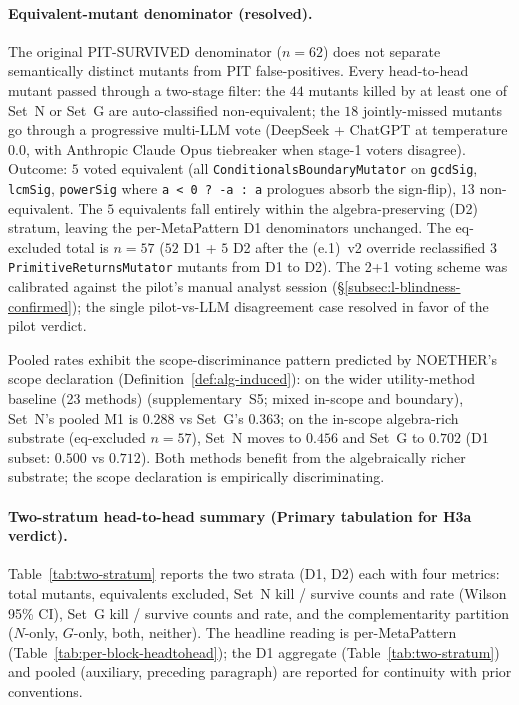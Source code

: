 \documentclass[acmsmall,screen,review]{acmart}
\begin{document}
\paragraph{Equivalent-mutant denominator (resolved).}\label{para:eq-mutant-footnote}
The original PIT-SURVIVED denominator ($n = 62$) does not separate semantically distinct mutants from PIT false-positives. Every head-to-head mutant passed through a two-stage filter: the $44$ mutants killed by at least one of Set~N or Set~G are auto-classified non-equivalent; the $18$ jointly-missed mutants go through a progressive multi-LLM vote (DeepSeek + ChatGPT at temperature $0.0$, with Anthropic Claude Opus tiebreaker when stage-1 voters disagree). Outcome: $5$ voted equivalent (all \texttt{ConditionalsBoundaryMutator} on \texttt{gcdSig}, \texttt{lcmSig}, \texttt{powerSig} where \texttt{a < 0 ? -a : a} prologues absorb the sign-flip), $13$ non-equivalent. The $5$ equivalents fall entirely within the algebra-preserving (D2) stratum, leaving the per-MetaPattern D1 denominators unchanged. The eq-excluded total is $n = 57$ ($52$ D1 + $5$ D2 after the (e.1)~v2 override reclassified $3$ \texttt{PrimitiveReturnsMutator} mutants from D1 to D2). The 2+1 voting scheme was calibrated against the pilot's manual analyst session (\S\ref{subsec:l-blindness-confirmed}); the single pilot-vs-LLM disagreement case resolved in favor of the pilot verdict.

Pooled rates exhibit the scope-discriminance pattern predicted by NOETHER's scope declaration (Definition~\ref{def:alg-induced}): on the wider utility-method baseline (23 methods) (supplementary~S5; mixed in-scope and boundary), Set~N's pooled M1 is $0.288$ vs Set~G's $0.363$; on the in-scope algebra-rich substrate (eq-excluded $n = 57$), Set~N moves to $0.456$ and Set~G to $0.702$ (D1 subset: $0.500$ vs $0.712$). Both methods benefit from the algebraically richer substrate; the scope declaration is empirically discriminating.

\paragraph{Two-stratum head-to-head summary (Primary tabulation for H3a verdict).}
\label{para:two-stratum}
Table~\ref{tab:two-stratum} reports the two strata (D1, D2) each
with four metrics: total mutants, equivalents excluded, Set~N kill
/ survive counts and rate (Wilson 95\% CI), Set~G kill / survive
counts and rate, and the complementarity partition ($N$-only,
$G$-only, both, neither). The headline reading is per-MetaPattern
(Table~\ref{tab:per-block-headtohead}); the D1 aggregate
(Table~\ref{tab:two-stratum}) and pooled (auxiliary, preceding
paragraph) are reported for continuity with prior conventions.
\end{document}

